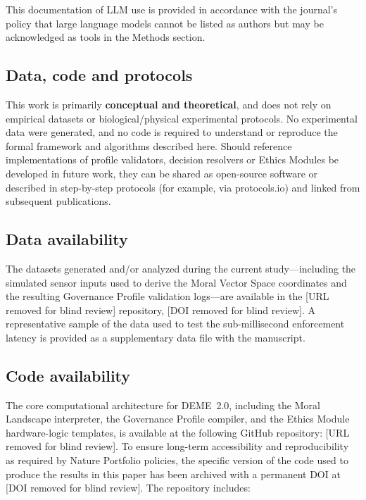 \documentclass[11pt]{article}
\begin{document}
This documentation of LLM use is provided in accordance with the journal's policy that large language models cannot be listed as authors but may be acknowledged as tools in the Methods section.

\subsection*{Data, code and protocols}

This work is primarily \textbf{conceptual and theoretical}, and does not rely on empirical datasets or biological/physical experimental protocols. No experimental data were generated, and no code is required to understand or reproduce the formal framework and algorithms described here. Should reference implementations of profile validators, decision resolvers or Ethics Modules be developed in future work, they can be shared as open-source software or described in step-by-step protocols (for example, via protocols.io) and linked from subsequent publications.

\subsection*{Data availability}

The datasets generated and/or analyzed during the current study---including the simulated sensor inputs used to derive the Moral Vector Space coordinates and the resulting Governance Profile validation logs---are available in the [URL removed for blind review] repository, [DOI removed for blind review]. A representative sample of the data used to test the sub-millisecond enforcement latency is provided as a supplementary data file with the manuscript.

\subsection*{Code availability}

The core computational architecture for DEME~2.0, including the Moral Landscape interpreter, the Governance Profile compiler, and the Ethics Module hardware-logic templates, is available at the following GitHub repository: [URL removed for blind review]. To ensure long-term accessibility and reproducibility as required by Nature Portfolio policies, the specific version of the code used to produce the results in this paper has been archived with a permanent DOI at [DOI removed for blind review]. The repository includes:
\end{document}
